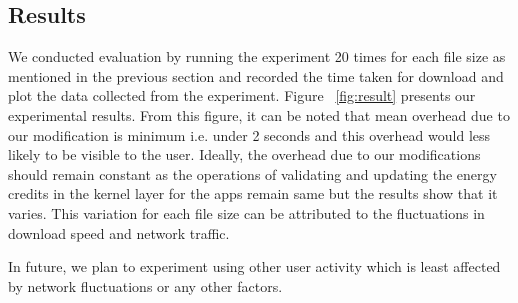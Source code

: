 \subsection{Results}
We conducted evaluation by running the experiment 20 times for each file size as mentioned in the previous section and recorded the time taken for download and plot the data collected from the experiment. Figure ~\ref{fig:result} presents our experimental results. From this figure, it can be noted that mean overhead due to our modification is minimum i.e. under 2 seconds and this overhead would less likely to be visible to the user. Ideally, the overhead due to our modifications should remain constant as the operations of validating and updating the energy credits in the kernel layer for the apps remain same but the results show that it varies. This variation for each file size can be attributed to the fluctuations in download speed and network traffic.

In future, we plan to experiment using other user activity which is least affected by network fluctuations or any other factors.



